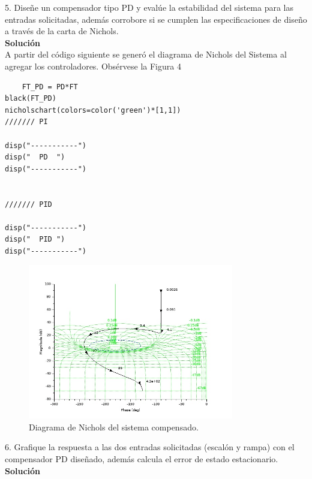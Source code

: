 \documentclass[12pt,letterpaper]{article}
\begin{document}
5. Diseñe un compensador tipo PD y evalúe la estabilidad del sistema para las entradas solicitadas, además corrobore si se cumplen las especificaciones de diseño a través de la carta de Nichols.\\

\textbf{Solución}\\




A partir del código siguiente se generó el diagrama de Nichols del Sistema al agregar los controladores. Obsérvese la Figura 4

\begin{verbatim}
    FT_PD = PD*FT
black(FT_PD)
nicholschart(colors=color('green')*[1,1])
/////// PI

disp("-----------")
disp(" 	PD	")
disp("-----------")


/////// PID

disp("-----------")
disp(" 	PID	")
disp("-----------")

\end{verbatim}

\begin{figure}
  \centering
    \includegraphics[width=0.8\textwidth]{nichols.jpg}
  \caption{Diagrama de Nichols del sistema compensado.}
  \label{fig:ejemplo}
\end{figure}


6. Grafique la respuesta a las dos entradas solicitadas (escalón y rampa) con el compensador PD diseñado, además calcula el error de estado estacionario.\\
\textbf{Solución}\\
\end{document}
